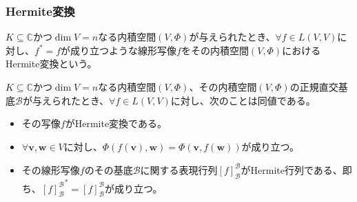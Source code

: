 \documentclass[dvipdfmx]{jsarticle}
\begin{document}
\subsubsection{Hermite変換}%
\begin{dfn}
$K \subseteq \mathbb{C}$かつ$\dim V = n$なる内積空間$(V,\varPhi)$が与えられたとき、$\forall f \in L(V,V)$に対し、$f^{*} = f$が成り立つような線形写像$f$をその内積空間$(V,\varPhi)$におけるHermite変換という。
\end{dfn}
\begin{thm}\label{2.3.8.9}
$K \subseteq \mathbb{C}$かつ$\dim V = n$なる内積空間$(V,\varPhi)$、その内積空間$(V,\varPhi)$の正規直交基底$\mathcal{B}$が与えられたとき、$\forall f \in L(V,V)$に対し、次のことは同値である。
\begin{itemize}
\item
  その写像$f$がHermite変換である。
\item
  $\forall\mathbf{v},\mathbf{w} \in V$に対し、$\varPhi\left( f\left( \mathbf{v} \right),\mathbf{w} \right) = \varPhi\left( \mathbf{v},f\left( \mathbf{w} \right) \right)$が成り立つ。
\item
  その線形写像$f$のその基底$\mathcal{B}$に関する表現行列$[ f]_{\mathcal{B}}^{\mathcal{B}}$がHermite行列である、即ち、${[ f]_{\mathcal{B}}^{\mathcal{B}}}^{*} = [ f]_{\mathcal{B}}^{\mathcal{B}}$が成り立つ。
\end{itemize}
\end{thm}
\end{document}
